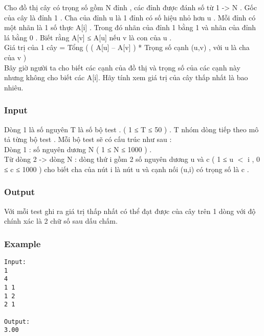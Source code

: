 



   Cho đồ thị cây có trọng số gồm N đỉnh , các đỉnh được đánh số từ 1 -> N . Gốc của cây là đỉnh 1 . Cha của đỉnh u là 1 đỉnh có số hiệu nhỏ hơn u . Mỗi đỉnh có một nhãn là 1 số thực A[i] . Trong đó nhãn của đỉnh 1 bằng 1 và nhãn của đỉnh lá bằng 0 . Biết rằng A[v] ≤ A[u] nếu v là con của u .   
\\   Giá trị của 1 cây = Tổng (  ( A[u] – A[v] ) * Trọng số cạnh (u,v)  , với u là cha của v )   
\\   Bây giờ người ta cho biết các cạnh của đồ thị và trọng số của các cạnh này nhưng không cho biết các A[i]. Hãy tính xem giá trị của cây thấp nhất là bao nhiêu.  

\subsubsection{   Input  }

   Dòng 1 là số nguyên T là số bộ test . (  1 ≤ T ≤ 50 ) . T nhóm dòng tiếp theo mô tả từng bộ test . Mỗi bộ test sẽ có cấu trúc như sau :   
\\   Dòng 1 : số nguyên dương N ( 1 ≤ N ≤ 1000 ) .   
\\   Từ dòng 2 -> dòng N : dòng thứ i gồm 2 số nguyên dương u và c ( 1 ≤ u $<$ i , 0 ≤ c ≤ 1000 ) cho biết cha của nút i là nút u và cạnh nối (u,i) có trọng số là c .  

\subsubsection{   Output  }

   Với mỗi test ghi ra giá trị thấp nhất có thể đạt được của cây trên 1 dòng với độ chính xác là 2 chữ số sau dấu chấm.  

\subsubsection{   Example  }
\begin{verbatim}
Input:
1
4
1 1
1 2
2 1

Output:
3.00
\end{verbatim}
